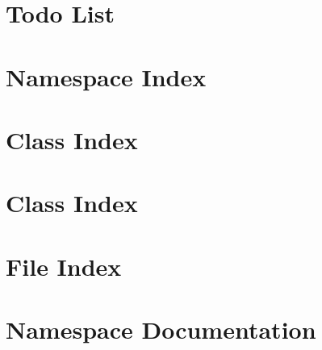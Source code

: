 \documentclass[a4paper]{article}
\begin{document}
\section{Todo List}
\label{todo}
\hypertarget{todo}{}

\section{Namespace Index}

\section{Class Index}

\section{Class Index}

\section{File Index}

\section{Namespace Documentation}






\end{document}

